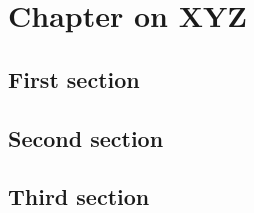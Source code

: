\chapter{Chapter on XYZ}
\blindtext[1]

\blindtext[1]

\blindtext[1]

\section{First section}
\blindtext[1]

\section{Second section}
\blindtext[1]

\section{Third section}
\blindtext[1]

\blindtext[1]